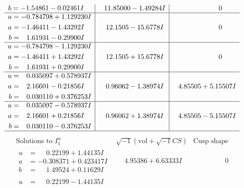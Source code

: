 \documentclass[1p]{elsarticle_modified}
\theoremstyle{definition}
\newcommand{\I}{\sqrt{-1}}
\begin{document}
$$\begin{array}{c|c|c}
\begin{aligned}
b &= -1.54861 - 0.02461 I\end{aligned}
 & \phantom{-}11.85000 - 1.49284 I & \phantom{-0.000000 } 0 \\ \hline\begin{aligned}
u &= -0.784798 + 1.129230 I \\
a &= -1.46411 - 1.43292 I \\
b &= \phantom{-}1.61931 - 0.29900 I\end{aligned}
 & \phantom{-}12.1505 - 15.6778 I & \phantom{-0.000000 } 0 \\ \hline\begin{aligned}
u &= -0.784798 - 1.129230 I \\
a &= -1.46411 + 1.43292 I \\
b &= \phantom{-}1.61931 + 0.29900 I\end{aligned}
 & \phantom{-}12.1505 + 15.6778 I & \phantom{-0.000000 } 0 \\ \hline\begin{aligned}
u &= \phantom{-}0.035097 + 0.578937 I \\
a &= \phantom{-}2.16601 - 0.21856 I \\
b &= \phantom{-}0.030110 + 0.376253 I\end{aligned}
 & \phantom{-}0.96062 - 1.38974 I & \phantom{-}4.85505 + 5.15507 I \\ \hline\begin{aligned}
u &= \phantom{-}0.035097 - 0.578937 I \\
a &= \phantom{-}2.16601 + 0.21856 I \\
b &= \phantom{-}0.030110 - 0.376253 I\end{aligned}
 & \phantom{-}0.96062 + 1.38974 I & \phantom{-}4.85505 - 5.15507 I\\
 \hline 
 \end{array}$$\newpage$$\begin{array}{c|c|c}  
\text{Solutions to }I^u_{1}& \I (\text{vol} + \sqrt{-1}CS) & \text{Cusp shape}\\
 \hline 
\begin{aligned}
u &= \phantom{-}0.22199 + 1.44135 I \\
a &= -0.308371 + 0.423417 I \\
b &= \phantom{-}1.49524 + 0.11629 I\end{aligned}
 & \phantom{-}4.95386 + 6.63333 I & \phantom{-0.000000 } 0 \\ \hline\begin{aligned}
u &= \phantom{-}0.22199 - 1.44135 I \\

\end{aligned}
\end{array}$$
\end{document}
